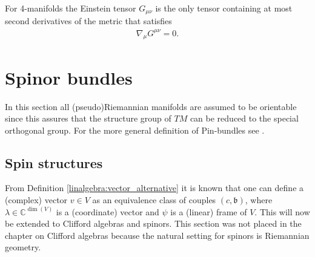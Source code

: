 
    \begin{property}
        For 4-manifolds the Einstein tensor $G_{\mu\nu}$ is the only tensor containing at most second derivatives of the metric that satisfies
        \begin{gather}
            \nabla_\mu G^{\mu\nu} = 0.
        \end{gather}
    \end{property}


\section{Spinor bundles}\label{section:spinor_bundles}

    In this section all (pseudo)Riemannian manifolds are assumed to be orientable since this assures that the structure group of $TM$ can be reduced to the special orthogonal group. For the more general definition of $\mathrm{Pin}$-bundles see \cite{AMP2}.

\subsection{Spin structures}

    From Definition \ref{linalgebra:vector_alternative} it is known that one can define a (complex) vector $v\in V$ as an equivalence class of couples $(c,\mathfrak{b})$, where $\lambda\in\mathbb{C}^{\dim(V)}$ is a (coordinate) vector and $\psi$ is a (linear) frame of $V$. This will now be extended to Clifford algebras and spinors. This section was not placed in the chapter on Clifford algebras because the natural setting for spinors is Riemannian geometry.

